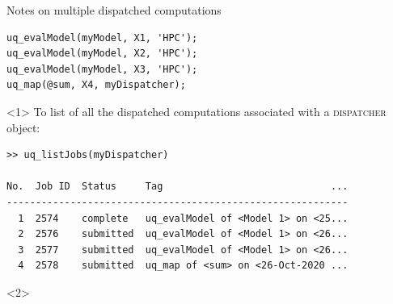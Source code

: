 \documentclass[]{rsuqbeamernew}
\begin{document}
\begin{frame}[fragile]{Notes on multiple dispatched computations}

\begin{lstlisting}[numbers=none]
uq_evalModel(myModel, X1, 'HPC');
uq_evalModel(myModel, X2, 'HPC');
uq_evalModel(myModel, X3, 'HPC');
uq_map(@sum, X4, myDispatcher);
\end{lstlisting}

\begin{onlyenv}<1>
To list of all the dispatched computations associated with a \textsc{dispatcher} object:
\begin{lstlisting}[numbers=none]
>> uq_listJobs(myDispatcher)

No.  Job ID  Status     Tag                             ...                          
-----------------------------------------------------------
  1  2574    complete   uq_evalModel of <Model 1> on <25...
  2  2576    submitted  uq_evalModel of <Model 1> on <26...
  3  2577    submitted  uq_evalModel of <Model 1> on <26...
  4  2578    submitted  uq_map of <sum> on <26-Oct-2020 ...
\end{lstlisting}
\end{onlyenv}

\begin{onlyenv}<2>
\emphconc{\textcolor{red}{Without a job scheduler, the remote machine can be flooded!}}
\end{onlyenv}

\end{frame}
\end{document}
